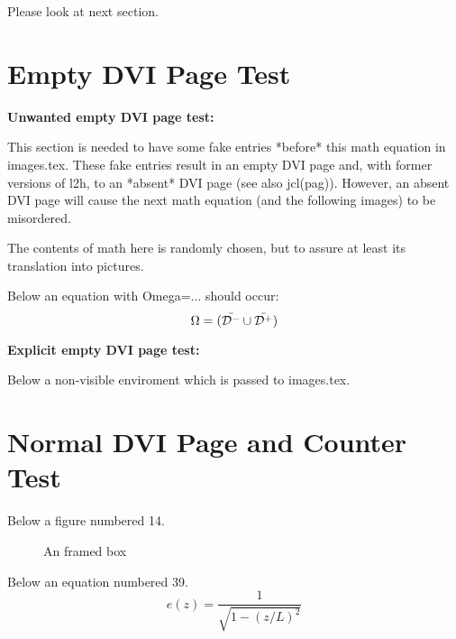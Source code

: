 \theoremstyle{plain}
\newtheorem{Defi}[equation]{Definition}
\newtheorem{Theo}[equation]{Theorem}

\theoremstyle{break}
\newtheorem{Pb}[equation]{Problem}
\theoremheaderfont{\scshape}




Please look at next section.

\section{Empty DVI Page Test}

{\bf Unwanted empty DVI page test:}

This section is needed to have some fake entries *before*
this math equation in images.tex. These fake entries result in an
empty DVI page and, with former versions of l2h, to an *absent*
DVI page (see also jcl(pag)).
However, an absent DVI page will cause the next math equation
(and the following images) to be misordered.

The contents of math here is randomly chosen, but to assure at
least its translation into pictures.

Below an equation with Omega=... should occur:
$$\Omega=(\bar{{\cal D}^-}\cup\bar{{\cal D}^+})$$

{\bf Explicit empty DVI page test:}

Below a non-visible enviroment which is passed to images.tex.

\begin{figure}\null\end{figure}


\section{Normal DVI Page and Counter Test}

Below a figure numbered 14.
\setcounter{figure}{13}
\setcounter{equation}{38}

\begin{figure}[hb]
\begin{center}
\end{center}\caption{An framed box}
\end{figure}

Below an equation numbered 39.
\begin{equation}
e(z)=\frac{1}{\sqrt{1-(z/L)^2}}
\end{equation}

